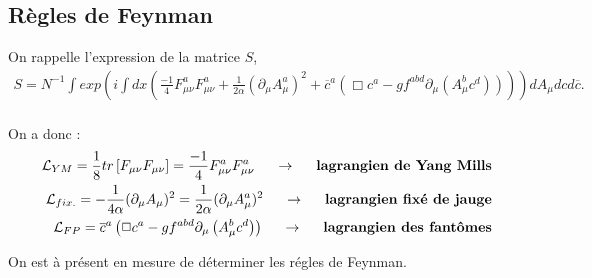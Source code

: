 \documentclass[a4paper,11pt]{article}
\theoremstyle{plain}
\theoremstyle{definition}
\theoremstyle{remark}
\numberwithin{equation}{section}
\numberwithin{equation}{subsection}
\numberwithin{figure}{section}
\begin{document}
\subsection{Règles de Feynman}

\noindent
On rappelle l'expression de la matrice $S$,
\begin{eqnarray}
 S = N^{-1} \int exp \left( 
i \int dx \left( 
\frac{-1}{4} F^{a}_{\mu \nu}F^{a}_{\mu \nu} + \frac{1}{2\alpha} (\partial_{\mu} A^{a}_{\mu})^{2} 
+  \overline{c}^{a} \left( \Box c^{a} -g f^{abd} \partial_{\mu} \left( A^{b}_{\mu} c^{d} \right) \right) \right)  \right)
dA_{\mu} dc d\overline{c}.  \nonumber \\
\end{eqnarray}

\noindent
On a donc :
\begin{eqnarray}
 && \mathcal{L}_{YM} = \frac{1}{8} tr \left[ F_{\mu \nu}F_{\mu \nu} \right] = \frac{-1}{4} F^{a}_{\mu \nu}F^{a}_{\mu \nu}
\hspace{5mm} \rightarrow \hspace{5mm} \textbf{lagrangien de Yang Mills}\\
 && \mathcal{L}_{fix.} = - \frac{1}{4\alpha} (\partial_{\mu} A_{\mu})^{2} = \frac{1}{2\alpha} (\partial_{\mu} A^{a}_{\mu})^{2}
\hspace{5mm} \rightarrow \hspace{5mm} \textbf{lagrangien fixé de jauge}\\
 && \mathcal{L}_{FP} =  \overline{c}^{a} \left( \Box c^{a} -g f^{abd} \partial_{\mu} \left( A^{b}_{\mu} c^{d} \right) \right)
\hspace{5mm} \rightarrow \hspace{5mm} \textbf{lagrangien des fantômes}
\end{eqnarray}

 \noindent
On est à présent en mesure de déterminer les régles de Feynman.
\end{document}
